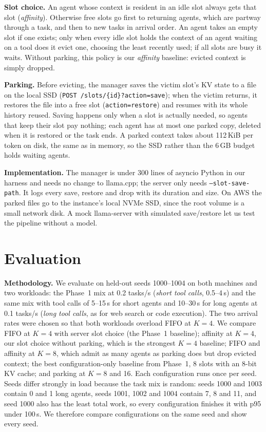 \documentclass[conference,letterpaper]{IEEEtran}
\begin{document}
\textbf{Slot choice.} An agent whose context is resident in an idle slot always gets that slot (\emph{affinity}). Otherwise free slots go first to returning agents, which are partway through a task, and then to new tasks in arrival order. An agent takes an empty slot if one exists; only when every idle slot holds the context of an agent waiting on a tool does it evict one, choosing the least recently used; if all slots are busy it waits. Without parking, this policy is our \emph{affinity} baseline: evicted context is simply dropped.

\textbf{Parking.} Before evicting, the manager saves the victim slot's KV state to a file on the local SSD (\texttt{POST /slots/\{id\}?action=save}); when the victim returns, it restores the file into a free slot (\texttt{action=restore}) and resumes with its whole history reused. Saving happens only when a slot is actually needed, so agents that keep their slot pay nothing; each agent has at most one parked copy, deleted when it is restored or the task ends. A parked context takes about 112\,KiB per token on disk, the same as in memory, so the SSD rather than the 6\,GB budget holds waiting agents.

\textbf{Implementation.} The manager is under 300 lines of asyncio Python in our harness and needs no change to llama.cpp; the server only needs \texttt{--slot-save-path}. It logs every save, restore and drop with its duration and size. On AWS the parked files go to the instance's local NVMe SSD, since the root volume is a small network disk. A mock llama-server with simulated save/restore let us test the pipeline without a model.

\section{Evaluation}
\textbf{Methodology.} We evaluate on held-out seeds 1000--1004 on both machines and two workloads: the Phase~1 mix at 0.2 tasks/s (\emph{short tool calls}, 0.5--4\,s) and the same mix with tool calls of 5--15\,s for short agents and 10--30\,s for long agents at 0.1 tasks/s (\emph{long tool calls}, as for web search or code execution). The two arrival rates were chosen so that both workloads overload FIFO at $K=4$. We compare FIFO at $K=4$ with server slot choice (the Phase~1 baseline); affinity at $K=4$, our slot choice without parking, which is the strongest $K=4$ baseline; FIFO and affinity at $K=8$, which admit as many agents as parking does but drop evicted context; the best configuration-only baseline from Phase~1, 8 slots with an 8-bit KV cache; and parking at $K=8$ and 16. Each configuration runs once per seed. Seeds differ strongly in load because the task mix is random: seeds 1000 and 1003 contain 0 and 1 long agents, seeds 1001, 1002 and 1004 contain 7, 8 and 11, and seed 1000 also has the least total work, so every configuration finishes it with p95 under 100\,s. We therefore compare configurations on the same seed and show every seed.
\end{document}

